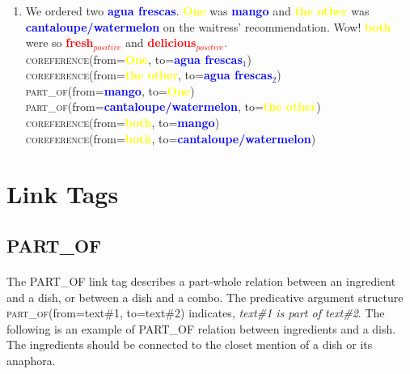 \documentclass{article}
\begin{document}
\begin{enumerate}[resume]
\item We ordered two \textbf{\textcolor{blue}{agua frescas}}. \textbf{\textcolor{yellow}{One}} was  \textbf{\textcolor{blue}{mango}} and \textbf{\textcolor{yellow}{the other}} was 
\textbf{\textcolor{blue}{cantaloupe/watermelon}} on the waitress' recommendation. Wow! 
\textbf{\textcolor{yellow}{both}} were so 
\textbf{\textcolor{red}{fresh$_{positive}$}} and 
\textbf{\textcolor{red}{delicious$_{positive}$}}.\\
\textsc{coreference}(from=\textbf{\textcolor{yellow}{One}}, to=\textbf{\textcolor{blue}{agua frescas$_{1}$}}) \\
\textsc{coreference}(from=\textbf{\textcolor{yellow}{the other}}, to=\textbf{\textcolor{blue}{agua frescas$_{2}$}}) \\
\textsc{part\_of}(from=\textbf{\textcolor{blue}{mango}}, to=\textbf{\textcolor{yellow}{One}})\\
\textsc{part\_of}(from=\textbf{\textcolor{blue}{cantaloupe/watermelon}}, to=\textbf{\textcolor{yellow}{the other}})\\
\textsc{coreference}(from=\textbf{\textcolor{yellow}{both}}, to=\textbf{\textcolor{blue}{mango}}) \\
\textsc{coreference}(from=\textbf{\textcolor{yellow}{both}}, to=\textbf{\textcolor{blue}{cantaloupe/watermelon}}) \\
\end{enumerate}
\newpage
\section{Link Tags}


\subsection{PART\_OF}
\paragraph{}
The PART\_OF link tag describes a part-whole relation between an ingredient and a dish, or between a dish and a combo. The predicative argument structure \textsc{part\_of}(from=text\#1, to=text\#2) indicates, \textit{text\#1 is part of text\#2}. The following is an example of PART\_OF relation between ingredients and a dish. The ingredients should be connected to the closet mention of a dish or its anaphora. 
\end{document}
